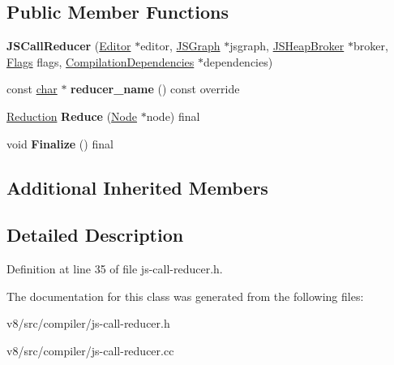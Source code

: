 \subsection*{Public Member Functions}
\begin{DoxyCompactItemize}
\item 
\mbox{\label{classv8_1_1internal_1_1compiler_1_1JSCallReducer_a7ce847291fa0a9e329fa55f0c9c724f8}} 
{\bfseries J\+S\+Call\+Reducer} (\mbox{\hyperlink{classv8_1_1internal_1_1compiler_1_1AdvancedReducer_1_1Editor}{Editor}} $\ast$editor, \mbox{\hyperlink{classv8_1_1internal_1_1compiler_1_1JSGraph}{J\+S\+Graph}} $\ast$jsgraph, \mbox{\hyperlink{classv8_1_1internal_1_1compiler_1_1JSHeapBroker}{J\+S\+Heap\+Broker}} $\ast$broker, \mbox{\hyperlink{classv8_1_1base_1_1Flags}{Flags}} flags, \mbox{\hyperlink{classv8_1_1internal_1_1compiler_1_1CompilationDependencies}{Compilation\+Dependencies}} $\ast$dependencies)
\item 
\mbox{\label{classv8_1_1internal_1_1compiler_1_1JSCallReducer_afb7225a49f2e322701138e6a2f159f0b}} 
const \mbox{\hyperlink{classchar}{char}} $\ast$ {\bfseries reducer\+\_\+name} () const override
\item 
\mbox{\label{classv8_1_1internal_1_1compiler_1_1JSCallReducer_abf441e16cdaa5b1d3be850e853803674}} 
\mbox{\hyperlink{classv8_1_1internal_1_1compiler_1_1Reduction}{Reduction}} {\bfseries Reduce} (\mbox{\hyperlink{classv8_1_1internal_1_1compiler_1_1Node}{Node}} $\ast$node) final
\item 
\mbox{\label{classv8_1_1internal_1_1compiler_1_1JSCallReducer_ab49b50a9fc062e9bfda06cb5ccb00301}} 
void {\bfseries Finalize} () final
\end{DoxyCompactItemize}
\subsection*{Additional Inherited Members}


\subsection{Detailed Description}


Definition at line 35 of file js-\/call-\/reducer.\+h.



The documentation for this class was generated from the following files\+:\begin{DoxyCompactItemize}
\item 
v8/src/compiler/js-\/call-\/reducer.\+h\item 
v8/src/compiler/js-\/call-\/reducer.\+cc\end{DoxyCompactItemize}
